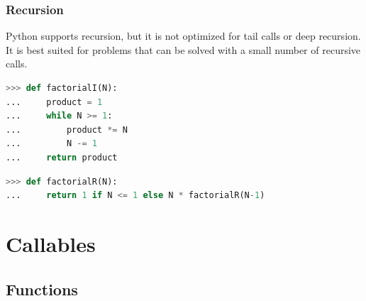 \documentclass[envcountsect,10pt]{beamer}
\begin{document}
\begin{frame}[fragile]
    \frametitle{Recursion}

    Python supports recursion, but it is not optimized for tail calls or deep recursion.
    It is best suited for problems that can be solved with a small number of recursive calls.

    \begin{lstlisting}[language=Python]
>>> def factorialI(N):
...     product = 1
...     while N >= 1:
...         product *= N
...         N -= 1
...     return product
    \end{lstlisting}

    \begin{lstlisting}[language=Python]
>>> def factorialR(N):
...     return 1 if N <= 1 else N * factorialR(N-1)
    \end{lstlisting}

\end{frame}

\section{Callables}

\subsection{Functions}
\end{document}
